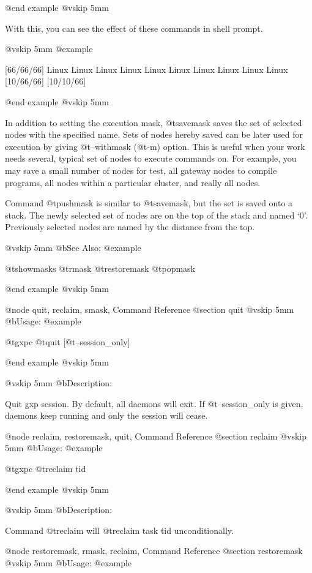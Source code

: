 @end example
@vskip 5mm

With this, you can see the effect of these commands in shell
prompt.

@vskip 5mm
@example

  [66/66/66]%
  Linux
  Linux
  Linux
  Linux
  Linux
  Linux
  Linux
  Linux
  Linux
  Linux
  [10/66/66]%
  [10/10/66]%

@end example
@vskip 5mm

In addition to setting the execution mask, @t{savemask} saves the set
of selected nodes with the specified name. Sets of nodes hereby
saved can be later used for execution by giving @t{--withmask} (@t{-m})
option. This is useful when your work needs several, typical set
of nodes to execute commands on. For example, you may save a
small number of nodes for test, all gateway nodes to compile
programs, all nodes within a particular cluster, and really all
nodes.

Command @t{pushmask} is similar to @t{savemask}, but the set is saved
onto a stack. The newly selected set of nodes are on the top of
the stack and named `0'.  Previously selected nodes are named by
the distance from the top.

@vskip 5mm
@b{See Also:}
@example

  @t{showmasks} @t{rmask} @t{restoremask} @t{popmask}

@end example
@vskip 5mm

@node quit, reclaim, smask, Command Reference
@section quit
@vskip 5mm
@b{Usage:}
@example

  @t{gxpc} @t{quit} [@t{--session_only}]

@end example
@vskip 5mm

@vskip 5mm
@b{Description:}


  Quit gxp session. By default, all daemons will exit.
If @t{--session_only} is given, daemons keep running and only the 
session will cease.

@node reclaim, restoremask, quit, Command Reference
@section reclaim
@vskip 5mm
@b{Usage:}
@example

  @t{gxpc} @t{reclaim} tid

@end example
@vskip 5mm

@vskip 5mm
@b{Description:}


  Command @t{reclaim} will @t{reclaim} task tid unconditionally.

@node restoremask, rmask, reclaim, Command Reference
@section restoremask
@vskip 5mm
@b{Usage:}
@example

